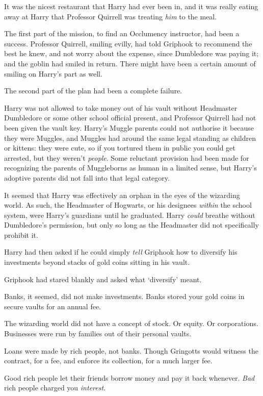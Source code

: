 It was the nicest restaurant that Harry had ever been in, and it was
really eating away at Harry that Professor Quirrell was treating
\emph{him} to the meal.

The first part of the mission, to find an Occlumency instructor, had
been a success. Professor Quirrell, smiling evilly, had told Griphook to
recommend the best he knew, and not worry about the expense, since
Dumbledore was paying it; and the goblin had smiled in return. There
might have been a certain amount of smiling on Harry's part as well.

The second part of the plan had been a complete failure.

Harry was not allowed to take money out of his vault without Headmaster
Dumbledore or some other school official present, and Professor Quirrell
had not been given the vault key. Harry's Muggle parents could not
authorise it because they were Muggles, and Muggles had around the same
legal standing as children or kittens: they were cute, so if you
tortured them in public you could get arrested, but they weren't
\emph{people}. Some reluctant provision had been made for recognizing
the parents of Muggleborns as human in a limited sense, but Harry's
adoptive parents did not fall into that legal category.

It seemed that Harry was effectively an orphan in the eyes of the
wizarding world. As such, the Headmaster of Hogwarts, or his designees
\emph{within} the school system, were Harry's guardians until he
graduated. Harry \emph{could} breathe without Dumbledore's permission,
but only so long as the Headmaster did not specifically prohibit it.

Harry had then asked if he could simply \emph{tell} Griphook how to
diversify his investments beyond stacks of gold coins sitting in his
vault.

Griphook had stared blankly and asked what `diversify' meant.

Banks, it seemed, did not make investments. Banks stored your gold coins
in secure vaults for an annual fee.

The wizarding world did not have a concept of stock. Or equity. Or
corporations. Businesses were run by families out of their personal
vaults.

Loans were made by rich people, not banks. Though Gringotts would
witness the contract, for a fee, and enforce its collection, for a much
larger fee.

Good rich people let their friends borrow money and pay it back
whenever. \emph{Bad} rich people charged you \emph{interest.}

